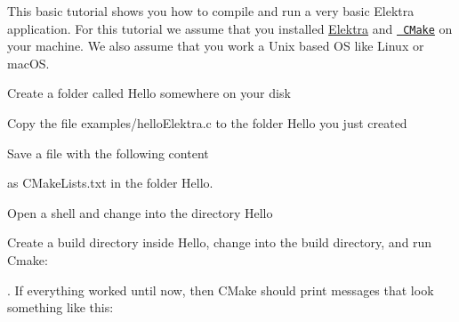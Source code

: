This basic tutorial shows you how to compile and run a very basic Elektra application. For this tutorial we assume that you installed \mbox{\hyperlink{doc_INSTALL_md}{Elektra}} and \href{http://cmake.org}{\texttt{ C\+Make}} on your machine. We also assume that you work a Unix based OS like Linux or mac\+OS.


\begin{DoxyEnumerate}
\item Create a folder called {\ttfamily Hello} somewhere on your disk
\item Copy the file {\ttfamily examples/hello\+Elektra.\+c} to the folder {\ttfamily Hello} you just created
\item Save a file with the following content
\end{DoxyEnumerate}


\begin{DoxyCode}{0}
\DoxyCodeLine{}
\DoxyCodeLine{}
\DoxyCodeLine{}
\end{DoxyCode}


as {\ttfamily C\+Make\+Lists.\+txt} in the folder {\ttfamily Hello}.


\begin{DoxyEnumerate}
\item Open a shell and change into the directory {\ttfamily Hello}
\item Create a build directory inside {\ttfamily Hello}, change into the build directory, and run Cmake\+:
\end{DoxyEnumerate}


\begin{DoxyCode}{0}
\end{DoxyCode}


. If everything worked until now, then C\+Make should print messages that look something like this\+:


